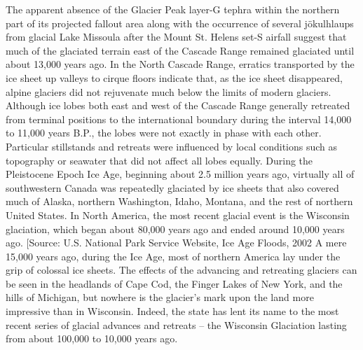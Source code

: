 	\ddd The apparent absence of the Glacier Peak layer-G tephra within the northern part of its projected fallout area along with the occurrence of several jökulhlaups from glacial Lake Missoula after the Mount St. Helens set-S airfall suggest that much of the glaciated terrain east of the Cascade Range remained glaciated until about 13,000 years ago. In the North Cascade Range, erratics transported by the ice sheet up valleys to cirque floors indicate that, as the ice sheet disappeared, alpine glaciers did not rejuvenate much below the limits of modern glaciers. Although ice lobes both east and west of the Cascade Range generally retreated from terminal positions to the international boundary during the interval 14,000 to 11,000 years B.P., the lobes were not exactly in phase with each other. Particular stillstands and retreats were influenced by local conditions such as topography or seawater that did not affect all lobes equally.
	\ddd During the Pleistocene Epoch Ice Age, beginning about 2.5 million years ago, virtually all of southwestern Canada was repeatedly glaciated by ice sheets that also covered much of Alaska, northern Washington, Idaho, Montana, and the rest of northern United States. In North America, the most recent glacial event is the Wisconsin glaciation, which began about 80,000 years ago and ended around 10,000 years ago. [Source: U.S. National Park Service Website, Ice Age Floods, 2002
	\ddd A mere 15,000 years ago, during the Ice Age, most of northern America lay under the grip of colossal ice sheets. The effects of the advancing and retreating glaciers can be seen in the headlands of Cape Cod, the Finger Lakes of New York, and the hills of Michigan, but nowhere is the glacier's mark upon the land more impressive than in Wisconsin. Indeed, the state has lent its name to the most recent series of glacial advances and retreats -- the Wisconsin Glaciation lasting from about 100,000 to 10,000 years ago.